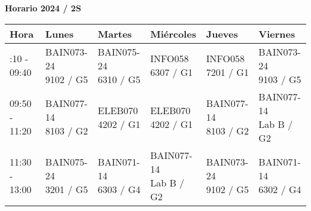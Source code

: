 \documentclass[extrafontsizes, 20pt]{memoir}
\begin{document}
\centering
{\LARGE\textbf{Horario 2024 / 2S}}
\vfill
\vspace{10pt}

\begin{table}[!ht]
  \centering
  \begin{tabular}{|>{\centering\arraybackslash}m{4.5cm}|*{5}{>{\centering\arraybackslash}m{4cm}|}}

    \hline
    \rowcolor[HTML]{20B2AA}
    \textbf{Hora}      &
    \textbf{Lunes}     &
    \textbf{Martes}    &
    \textbf{Miércoles} &
    \textbf{Jueves}    &
    \textbf{Viernes} \\
    \hline

    08:10 - 09:40      &
    \parbox[m]{4cm}{\centering\small BAIN073-24\\ \footnotesize 9102 / G5} & %
    \parbox[m]{4cm}{\centering\small BAIN075-24\\ \footnotesize 6310 / G5} & %
    \parbox[m]{4cm}{\centering\small INFO058\\ \footnotesize 6307 / G1} & %
    \parbox[m]{4cm}{\centering\small INFO058\\ \footnotesize 7201 / G1} & %
    \parbox[m]{4cm}{\centering\small BAIN073-24\\ \footnotesize 9103 / G5} \\ %
    \hline

    09:50 - 11:20      &
    \parbox[m]{4cm}{\centering\small BAIN077-14\\ \footnotesize 8103 / G2} & %
    \parbox[m]{4cm}{\centering\small ELEB070\\ \footnotesize 4202 / G1} & %
    \parbox[m]{4cm}{\centering\small ELEB070\\ \footnotesize 4202 / G1} & %
    \parbox[m]{4cm}{\centering\small BAIN077-14\\ \footnotesize 8103 / G2} & %
    \parbox[m]{4cm}{\centering\small BAIN077-14\\ \footnotesize Lab B / G2} \\ %
    \hline

    11:30 - 13:00      &
    \parbox[m]{4cm}{\centering\small BAIN075-24\\ \footnotesize 3201 / G5} & %
    \parbox[m]{4cm}{\centering\small BAIN071-14\\ \footnotesize 6303 / G4} & %
    \parbox[m]{4cm}{\centering\small BAIN077-14\\ \footnotesize Lab B / G2} & %
    \parbox[m]{4cm}{\centering\small BAIN073-24\\ \footnotesize 9102 / G5} & %
    \parbox[m]{4cm}{\centering\small BAIN071-14\\ \footnotesize 6302 / G4} \\ %
    \hline


\end{tabular}
\end{table}
\end{document}

